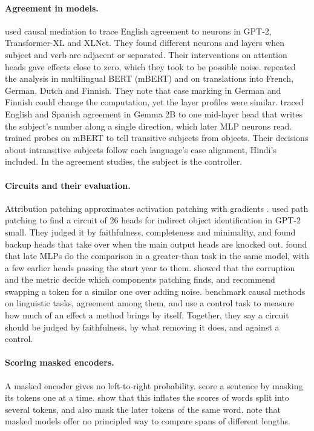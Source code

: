 \documentclass[11pt]{article}
\begin{document}
\paragraph{Agreement in models.}
\citet{finlayson2021} used causal mediation to trace English agreement to neurons in GPT-2, Transformer-XL and XLNet.
They found different neurons and layers when subject and verb are adjacent or separated.
Their interventions on attention heads gave effects close to zero, which they took to be possible noise.
\citet{mueller2022} repeated the analysis in multilingual BERT (mBERT) and on translations into French, German, Dutch and Finnish.
They note that case marking in German and Finnish could change the computation, yet the layer profiles were similar.
\citet{ferrando2024} traced English and Spanish agreement in Gemma 2B to one mid-layer head that writes the subject's number along a single direction, which later MLP neurons read.
\citet{papadimitriou2021} trained probes on mBERT to tell transitive subjects from objects.
Their decisions about intransitive subjects follow each language's case alignment, Hindi's included.
In the agreement studies, the subject is the controller.

\paragraph{Circuits and their evaluation.}
Attribution patching approximates activation patching with gradients \citep{syed2024}.
\citet{wang2023} used path patching to find a circuit of 26 heads for indirect object identification in GPT-2 small.
They judged it by faithfulness, completeness and minimality, and found backup heads that take over when the main output heads are knocked out.
\citet{hanna2023} found that late MLPs do the comparison in a greater-than task in the same model, with a few earlier heads passing the start year to them.
\citet{zhang2024} showed that the corruption and the metric decide which components patching finds, and recommend swapping a token for a similar one over adding noise.
\citet{arora2024} benchmark causal methods on linguistic tasks, agreement among them, and use a control task to measure how much of an effect a method brings by itself.
Together, they say a circuit should be judged by faithfulness, by what removing it does, and against a control.

\paragraph{Scoring masked encoders.}
A masked encoder gives no left-to-right probability.
\citet{salazar2020} score a sentence by masking its tokens one at a time.
\citet{kauf2023} show that this inflates the scores of words split into several tokens, and also mask the later tokens of the same word.
\citet{mueller2022} note that masked models offer no principled way to compare spans of different lengths.
\end{document}
